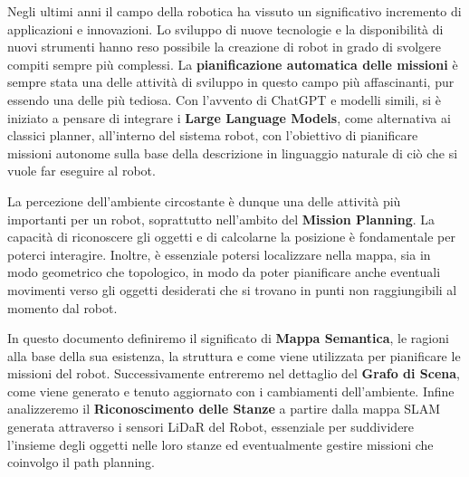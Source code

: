 
Negli ultimi anni il campo della robotica ha vissuto un significativo incremento di applicazioni e innovazioni. Lo sviluppo di nuove tecnologie e la disponibilità di nuovi strumenti hanno reso possibile la creazione di robot in grado di svolgere compiti sempre più complessi. La \textbf{pianificazione automatica delle missioni} è sempre stata una delle attività di sviluppo in questo campo più affascinanti, pur essendo una delle più tediosa. Con l'avvento di ChatGPT e modelli simili, si è iniziato a pensare di integrare i \textbf{Large Language Models}, come alternativa ai classici planner, all'interno del sistema robot, con l'obiettivo di pianificare missioni autonome sulla base della descrizione in linguaggio naturale di ciò che si vuole far eseguire al robot.

La percezione dell'ambiente circostante è dunque una delle attività più importanti per un robot, soprattutto nell'ambito del \textbf{Mission Planning}. La capacità di riconoscere gli oggetti e di calcolarne la posizione è fondamentale per poterci interagire. Inoltre, è essenziale potersi localizzare nella mappa, sia in modo geometrico che topologico, in modo da poter pianificare anche eventuali movimenti verso gli oggetti desiderati che si trovano in punti non raggiungibili al momento dal robot.

In questo documento definiremo il significato di \textbf{Mappa Semantica}, le ragioni alla base della sua esistenza, la struttura e come viene utilizzata per pianificare le missioni del robot. Successivamente entreremo nel dettaglio del \textbf{Grafo di Scena}, come viene generato e tenuto aggiornato con i cambiamenti dell'ambiente. Infine analizzeremo il \textbf{Riconoscimento delle Stanze} a partire dalla mappa SLAM generata attraverso i sensori LiDaR del Robot, essenziale per suddividere l'insieme degli oggetti nelle loro stanze ed eventualmente gestire missioni che coinvolgo il path planning.
